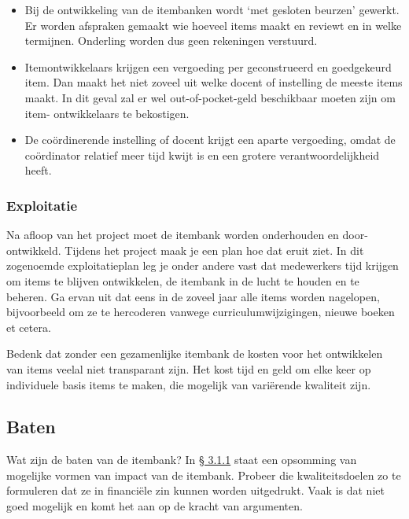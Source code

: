 \documentclass[
]{book}
\providecommand{\tightlist}{%
  \setlength{\itemsep}{0pt}\setlength{\parskip}{0pt}}
\begin{document}
\begin{itemize}
\tightlist
\item
  Bij de ontwikkeling van de itembanken wordt `met gesloten beurzen' gewerkt. Er worden afspraken gemaakt wie hoeveel items maakt en reviewt en in welke termijnen. Onderling worden dus geen rekeningen verstuurd.
\item
  Itemontwikkelaars krijgen een vergoeding per geconstrueerd en goedgekeurd item. Dan maakt het niet zoveel uit welke docent of instelling de meeste items maakt. In dit geval zal er wel out-of-pocket-geld beschikbaar moeten zijn om item- ontwikkelaars te bekostigen.
\item
  De coördinerende instelling of docent krijgt een aparte vergoeding, omdat de coördinator relatief meer tijd kwijt is en een grotere verantwoordelijkheid heeft.
\end{itemize}

\hypertarget{exploitatie}{%
\subsubsection{Exploitatie}\label{exploitatie}}

Na afloop van het project moet de itembank worden onderhouden en door- ontwikkeld. Tijdens het project maak je een plan hoe dat eruit ziet. In dit zogenoemde exploitatieplan leg je onder andere vast dat medewerkers tijd krijgen om items te blijven ontwikkelen, de itembank in de lucht te houden en te beheren. Ga ervan uit dat eens in de zoveel jaar alle items worden nagelopen, bijvoorbeeld om ze te hercoderen vanwege curriculumwijzigingen, nieuwe boeken et cetera.

Bedenk dat zonder een gezamenlijke itembank de kosten voor het ontwikkelen van items veelal niet transparant zijn. Het kost tijd en geld om elke keer op individuele basis items te maken, die mogelijk van variërende kwaliteit zijn.

\hypertarget{baten}{%
\subsection{Baten}\label{baten}}

Wat zijn de baten van de itembank? In \protect\hyperlink{waarom-een-itembank}{§ 3.1.1} staat een opsomming van mogelijke vormen van impact van de itembank. Probeer die kwaliteitsdoelen zo te formuleren dat ze in financiële zin kunnen worden uitgedrukt. Vaak is dat niet goed mogelijk en komt het aan op de kracht van argumenten.
\end{document}
